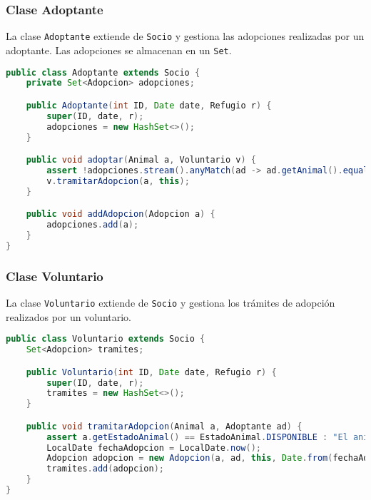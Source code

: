 \subsubsection{Clase Adoptante}
La clase \texttt{Adoptante} extiende de \texttt{Socio} y gestiona las adopciones realizadas 
por un adoptante. Las adopciones se almacenan en un \texttt{Set}.
\label{codigo:adoptante}
\begin{lstlisting}[style = javaNormal, language=Java] 
public class Adoptante extends Socio {
    private Set<Adopcion> adopciones;

    public Adoptante(int ID, Date date, Refugio r) {
        super(ID, date, r);
        adopciones = new HashSet<>();
    }

    public void adoptar(Animal a, Voluntario v) {
        assert !adopciones.stream().anyMatch(ad -> ad.getAnimal().equals(a)) : "El adoptante ya tiene registrado este animal";
        v.tramitarAdopcion(a, this);
    }

    public void addAdopcion(Adopcion a) {
        adopciones.add(a);
    }
}
\end{lstlisting}

\subsubsection{Clase Voluntario}
La clase \texttt{Voluntario} extiende de \texttt{Socio} y gestiona los trámites de 
adopción realizados por un voluntario.
\label{codigo:voluntario}
\begin{lstlisting}[style = javaNormal, language=Java] 
public class Voluntario extends Socio {
    Set<Adopcion> tramites;

    public Voluntario(int ID, Date date, Refugio r) {
        super(ID, date, r);
        tramites = new HashSet<>();
    }

    public void tramitarAdopcion(Animal a, Adoptante ad) {
        assert a.getEstadoAnimal() == EstadoAnimal.DISPONIBLE : "El animal ya esta adoptado.";
        LocalDate fechaAdopcion = LocalDate.now();
        Adopcion adopcion = new Adopcion(a, ad, this, Date.from(fechaAdopcion.atStartOfDay(ZoneId.systemDefault()).toInstant()));
        tramites.add(adopcion);
    }
}
\end{lstlisting}

